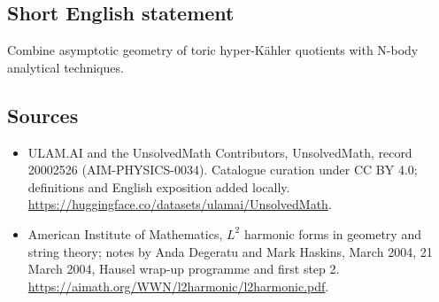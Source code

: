 \documentclass[11pt]{article}
\begin{document}
\subsection{Short English statement}
Combine asymptotic geometry of toric hyper-Kähler quotients with N-body analytical techniques.
\subsection{Sources}
\begin{itemize}
\item[\hypertarget{source:20002526:1}{S1}] ULAM.AI and the UnsolvedMath Contributors, UnsolvedMath, record 20002526 (AIM-PHYSICS-0034). Catalogue curation under CC BY 4.0; definitions and English exposition added locally.
\url{https://huggingface.co/datasets/ulamai/UnsolvedMath}.
\item[\hypertarget{source:20002526:2}{S2}] American Institute of Mathematics, $L^2$ harmonic forms in geometry and string theory; notes by Anda Degeratu and Mark Haskins, March 2004, 21 March 2004, Hausel wrap-up programme and first step 2.
\url{https://aimath.org/WWN/l2harmonic/l2harmonic.pdf}.
\end{itemize}
\label{end:20002526}
\end{document}
